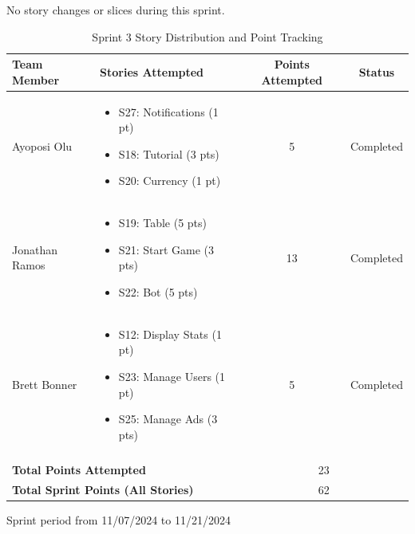      



\begin{table}[h]
\centering
No story changes or slices during this sprint.

\caption{Sprint 3 Story Distribution and Point Tracking}
\begin{tabular}{|p{3cm}|p{6cm}|c|c|}
\hline
\textbf{Team Member} & \textbf{Stories Attempted} & \textbf{Points Attempted} & \textbf{Status} \\
\hline
Ayoposi Olu & 
\begin{itemize}
    \item S27: Notifications (1 pt)
    \item S18: Tutorial (3 pts)
    \item S20: Currency (1 pt)
\end{itemize} & 
5 & 
Completed \\
\hline
Jonathan Ramos & 
\begin{itemize}
    \item S19: Table (5 pts)
    \item S21: Start Game (3 pts)
    \item S22: Bot (5 pts)
\end{itemize}& 
13 & 
Completed \\
\hline
Brett Bonner & 
\begin{itemize}
    \item S12: Display Stats (1 pt)
    \item S23: Manage Users (1 pt)
    \item S25: Manage Ads (3 pts)
\end{itemize} & 
5 & 
Completed \\
\hline
\multicolumn{4}{|c|}{} \\
\hline
\multicolumn{2}{|l|}{\textbf{Total Points Attempted}} & \multicolumn{2}{c|}{23} \\
\hline
\multicolumn{2}{|l|}{\textbf{Total Sprint Points (All Stories)}} & \multicolumn{2}{c|}{62} \\
\hline
\end{tabular}

\vspace{0.5cm}
\begin{center}
\small{Sprint period from 11/07/2024 to 11/21/2024}
\end{center}
\end{table}

